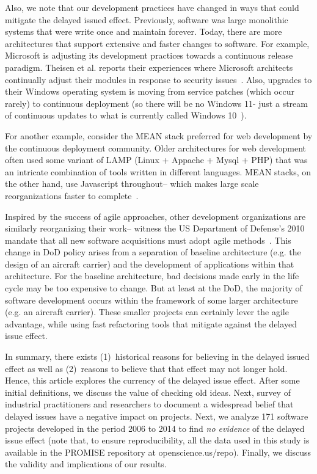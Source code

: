 \documentclass{sig-alternate}
\begin{document}
Also, we note that our development practices have changed in ways that could   mitigate the delayed issued effect.  Previously,
software was large monolithic systems that were write once and maintain
forever. Today, there are more architectures that
support  extensive and faster changes to software. 
For example, 
Microsoft is adjusting its development practices towards a continuous
release paradigm. Theisen et al. reports their experiences where Microsoft architects
continually adjust  their modules in response to security issues~\cite{theisen15}.
Also, upgrades to their Windows operating system is moving from service patches (which occur rarely) to continuous deployment (so there will be no Windows 11- just a stream of continuous updates to what is currently called Windows 10~\cite{bright15}).

For another example, consider the MEAN stack preferred for web development by
the continuous deployment community. Older architectures for web development
often used some variant of LAMP (Linux + Appache + Mysql + PHP) that was an intricate
combination of tools written in different languages. MEAN stacks, on the other hand,
use Javascript throughout-- which makes large scale reorganizations faster to complete~\cite{wayner15}. 

Inspired by the success of agile approaches, other  development organizations are similarly reorganizing their work-- witness the US Department of Defense's 2010 mandate
that all new software acquisitions must adopt agile methods~\cite{kim13}. 
This change in DoD policy arises from a separation of baseline architecture
(e.g. the design of an 
aircraft carrier) and the development of applications within that architecture.
For the baseline architecture, bad decisions
made  early in the life cycle may be too expensive to change.
But at least at the DoD, the majority of software development occurs within
the framework of some larger architecture (e.g. an aircraft carrier).
These smaller projects can certainly lever the agile advantage, while 
using fast refactoring tools that mitigate against  the delayed issue effect.


In summary, there exists (1)~historical reasons for believing in the delayed issued
effect as well as (2)~reasons to believe that that effect may not longer hold.
Hence,  this article explores the currency of the delayed issue effect.
After some initial definitions, we discuss the
value of checking old ideas. Next, survey of industrial practitioners and researchers to document a widespread belief that delayed issues have a negative impact on projects.  Next, we  analyze 171 software  projects developed in the period 2006 to 2014 to find  {\em no evidence} of the delayed issue effect
(note that, to ensure reproducibility,
all the data  used in this study is available in the PROMISE
repository at openscience.us/repo). Finally, we discuss the validity and implications of our results.
 
\end{document}
